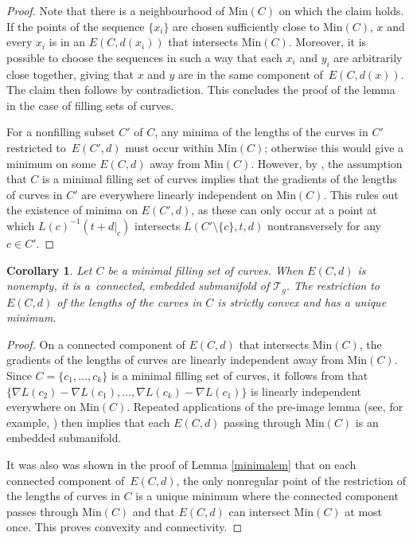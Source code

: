 \documentclass[11pt]{article}
\numberwithin{equation}{section}
\numberwithin{equation}{section}
\newtheorem{Corollary}[Theorem]{Corollary}
\begin{document}
\begin{proof}
Note that there is a neighbourhood of $\mathrm{Min}(C)$ on which the claim holds. If the points of the sequence $\{x_{i}\}$ are chosen sufficiently close to $\mathrm{Min}(C)$, $x$ and every $x_{i}$ is in an $E(C,d(x_{i}))$ that intersects $\mathrm{Min}(C)$. Moreover, it is possible to choose the sequences in such a way that each $x_{i}$ and $y_{i}$ are arbitrarily close together, giving that $x$ and $y$ are in the same component of~$E(C,d(x))$. The claim then follows by contradiction. This concludes the proof of the lemma in the case of filling sets of curves.

For a nonfilling subset $C'$ of $C$, any minima of the lengths of the curves in $C'$ restricted to~$E(C',d)$ must occur within $\mathrm{Min}(C)$; otherwise this would give a minimum on some $E(C,d)$ away from $\mathrm{Min}(C)$. However, by \cite[Lemma 5]{SchmutzMorse}, the assumption that $C$ is a minimal filling set of curves implies that the gradients of the lengths of curves in $C'$ are everywhere linearly independent on $\mathrm{Min}(C)$. This rules out the existence of minima on $E(C',d)$, as these can only occur at a point at which $L(c)^{-1}(t+d|_{c})$ intersects $L(C'\setminus \{c\},t,d)$ nontransversely for any~${c\in C'}$.
\end{proof}


\begin{Corollary}
\label{linear}
Let $C$ be a minimal filling set of curves. When $E(C,d)$ is nonempty, it is a~connected, embedded submanifold of $\mathcal{T}_{g}$. The restriction to $E(C,d)$ of the lengths of the curves in $C$ is strictly convex and has a unique minimum.
\end{Corollary}

\begin{proof}
On a connected component of $E(C,d)$ that intersects $\mathrm{Min}(C)$, the gradients of the lengths of curves are linearly independent away from $\mathrm{Min}(C)$. Since $C=\{c_{1}, \dots, c_{k}\}$ is a minimal filling set of curves, it follows from \cite[Lemma 5]{SchmutzMorse} that $\bigl\{\nabla L(c_{2})-\nabla L(c_{1}), \dots, \nabla L(c_{k})-\nabla L(c_{1})\bigr\}$ is linearly independent everywhere on $\mathrm{Min}(C)$. Repeated applications of the pre-image lemma (see, for example, \cite[Corollary 5.14]{Lee}) then implies that each $E(C,d)$ passing through $\mathrm{Min}(C)$ is an embedded submanifold.

It was also was shown in the proof of Lemma \ref{minimalem} that on each connected component of~$E(C,d)$, the only nonregular point of the restriction of the lengths of curves in $C$ is a unique minimum where the connected component passes through $\mathrm{Min}(C)$ and that $E(C,d)$ can intersect $\mathrm{Min}(C)$ at most once. This proves convexity and connectivity.
\end{proof}
\end{document}
